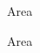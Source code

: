 \documentclass[a4paper]{article}
\begin{document}
\printGenericVSLHeader
\begin{center}
\begin{vsltext}{3cm}{3.5cm}

Area \AreaA

\vspace{3cm}

Area \AreaC

\end{vsltext}

\end{center}
\end{document}
